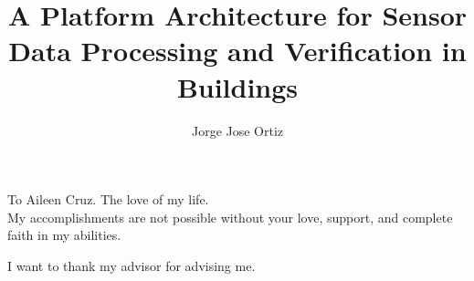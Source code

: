 \documentclass{ucbthesis}
\begin{document}

\title{A Platform Architecture for Sensor Data Processing and Verification in Buildings}
\author{Jorge Jose Ortiz}




\maketitle
\approvalpage
\copyrightpage



\begin{frontmatter}

\begin{dedication}
\null\vfil
\begin{center}
To Aileen Cruz.  The love of my life.\\\vspace{12pt}
My accomplishments are not possible without your love, support, and complete faith in my abilities.
\end{center}
\vfil\null
\end{dedication}

\tableofcontents
\clearpage
\listoffigures
\clearpage
\listoftables

\begin{acknowledgements}
I want to thank my advisor for advising me.




\end{acknowledgements}

\end{frontmatter}
\end{document}
